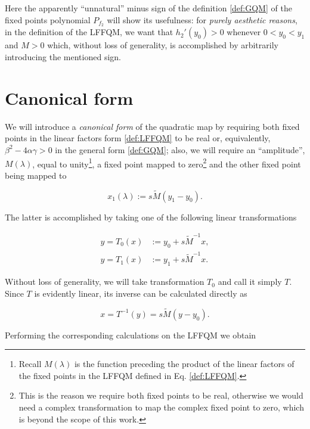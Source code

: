 \documentclass[10pt,twoside,titlepage]{book}
\numberwithin{equation}{chapter}
\numberwithin{figure}{chapter}
\numberwithin{table}{chapter}
\theoremstyle{plain}%
\theoremstyle{definition}
\theoremstyle{remark}
\begin{document}
\label{minus_sign}Here the apparently ``unnatural'' minus sign of the definition \ref{def:GQM} of the fixed points polynomial $P_{f_2}$ will show its usefulness: for \emph{purely aesthetic reasons}, in the definition of the LFFQM, we want that $h_2'(y_0)>0$ whenever $0<y_0<y_1$ and $M>0$ which, without loss of generality, is accomplished by arbitrarily introducing the mentioned sign.

\section{Canonical form}

We will introduce a \emph{canonical form} of the quadratic map by requiring both fixed points in the linear factors form \eqref{def:LFFQM} to be real or, equivalently, $\beta^2-4\alpha\gamma>0$ in the general form \eqref{def:GQM}; also, we will require an ``amplitude'', $M(\lambda)$, equal to unity\footnote{Recall $M(\lambda)$ is the function  preceding the product of the linear factors of the fixed points in the LFFQM defined in Eq. \eqref{def:LFFQM}.}, a fixed point mapped to zero\footnote{This is the reason we require both fixed points to be real, otherwise we would need a complex transformation to map the complex fixed point to zero, which is beyond the scope of this work.} and the other fixed point being mapped to

\begin{equation} \label{eq:x1dependence}
	x_1(\lambda):=s\tilde{M}(y_1-y_0).
\end{equation}

The latter is accomplished by taking one of the following linear transformations

\begin{equation}
	\begin{aligned}
		y=T_0(x) &:= y_0+s\tilde{M}^{-1}x, \\
		y=T_1(x) &:= y_1+s\tilde{M}^{-1}x.
	\end{aligned}
\end{equation}

Without loss of generality, we will take transformation $T_0$ and call it simply $T$. Since $T$ is evidently linear, its inverse can be calculated directly as

\begin{equation}
	\label{eq:invT}
	x=T^{-1}(y)=s\tilde{M}(y-y_0).
\end{equation}

Performing the corresponding calculations on the LFFQM we obtain
\end{document}
